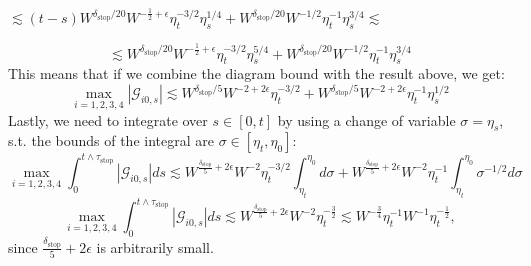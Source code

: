 \documentclass[11pt]{article}
\newcommand{\sto}{\text{stop}}
\begin{document}
\begin{center}
$\lesssim  (t-s) W^{\delta_\sto/20}W^{-\frac{1}{2}+\epsilon}\eta_t^{-3/2}\eta_s^{1/4} + W^{\delta_\sto/20}W^{-1/2}\eta_t^{-1}\eta_s^{3/4}\lesssim$
\end{center}
\begin{equation*}\lesssim W^{\delta_\sto/20}W^{-\frac{1}{2}+\epsilon}\eta_t^{-3/2}\eta_s^{5/4} + W^{\delta_\sto/20}W^{-1/2}\eta_t^{-1}\eta_s^{3/4}\tag{6.1}\end{equation*}
This means that if we combine the diagram bound with the result above, we get: 
\begin{equation*}\max_{i=1, 2, 3, 4}|\mathcal{G}_{i0, s}|\lesssim W^{\delta_\sto/5}W^{-2+2\epsilon}\eta_t^{-3/2} + W^{\delta_\sto/5}W^{-2+2\epsilon}\eta_t^{-1}\eta_s^{1/2}\end{equation*}
Lastly, we need to integrate over $s\in [0, t]$ by using a change of variable $\sigma =\eta_s$, s.t. the bounds of the integral are $\sigma\in [\eta_t, \eta_0]$:
$$\max_{i=1, 2, 3, 4} \int_0^{t\wedge \tau_\sto}|\mathcal{G}_{i0, s}|ds\lesssim W^{\frac{\delta_\sto}{5}+2\epsilon} W^{-2}\eta_t^{-3/2} \int_{\eta_t}^{\eta_0}d\sigma + W^{\frac{\delta_\sto}{5}+2\epsilon}W^{-2}\eta_t^{-1}\int_{\eta_t}^{\eta_0}\sigma^{-1/2}d\sigma $$
\begin{equation*}\max_{i=1, 2, 3, 4} \int_0^{t\wedge \tau_\sto}|\mathcal{G}_{i0, s}|ds\lesssim W^{\frac{\delta_\sto}{5}+2\epsilon} W^{-2}\eta_t^{-\frac{3}{2}}\lesssim W^{-\frac{3}{4}}\eta_t^{-1}W^{-1}\eta_t^{-\frac{1}{2}},\tag{6.2}\end{equation*}
since $\frac{\delta_\sto}{5}+2\epsilon$ is arbitrarily small. 
\newpage
\end{document}

